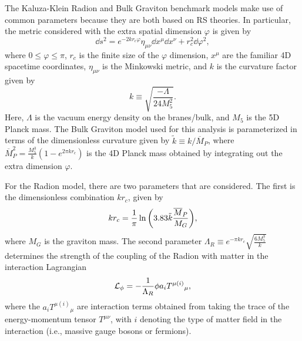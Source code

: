 The Kaluza-Klein Radion and Bulk Graviton benchmark models make use of common parameters because they are both based on RS theories.
In particular, the metric considered with the extra spatial dimension $\varphi$ is given by~\cite{carvalho2018gravity}
\begin{equation}
  \dd{s}^2=e^{-2kr_c\varphi}\eta_{\mu\nu}\dd{x}^\mu\dd{x}^\nu+r_c^2\dd{\varphi}^2,
\end{equation}
where $0\leq\varphi\leq\pi$, $r_c$ is the finite size of the $\varphi$ dimension, $x^\mu$ are the familiar 4D spacetime coordinates, $\eta_{\mu\nu}$ is the Minkowski metric, and $k$ is the curvature factor given by
\begin{equation}
  k\equiv\sqrt{\frac{-\Lambda}{24M_5^2}}.
\end{equation}
Here, $\Lambda$ is the vacuum energy density on the branes/bulk, and $M_5$ is the 5D Planck mass.
The Bulk Graviton model used for this analysis is parameterized in terms of the dimensionless curvature given by $\tilde{k}\equiv{k/\overline{M}_P}$, where $\overline{M}_P^2=\frac{M_5^3}{k}(1-e^{2\pi kr_c})$ is the 4D Planck mass obtained by integrating out the extra dimension $\varphi$.

For the Radion model, there are two parameters that are considered.
The first is the dimensionless combination $kr_c$, given by
\begin{equation}
  kr_c=\frac{1}{\pi}\ln\pqty{3.83\tilde{k}\frac{\overline{M}_P}{M_G}},
\end{equation}
where $M_G$ is the graviton mass.
The second parameter $\Lambda_R\equiv e^{-\pi kr_c}\sqrt{\frac{6M_5^3}{k}}$ determines the strength of the coupling of the Radion with matter in the interaction Lagrangian
\begin{equation}
  \mathcal{L}_\phi=-\frac{1}{\Lambda_R}\phi a_iT^{\mu(i)}{}_\mu,
\end{equation}
where the $a_iT^{\mu(i)}{}_\mu$ are interaction terms obtained from taking the trace of the energy-momentum tensor $T^{\mu\nu}$, with $i$ denoting the type of matter field in the interaction (i.e., massive gauge bosons or fermions).

